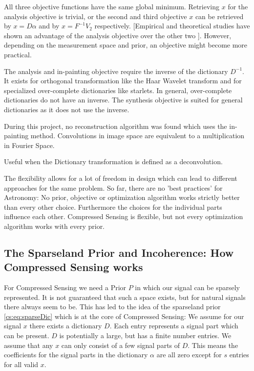 All three objective functions have the same global minimum. Retrieving $x$ for the analysis objective is trivial, or the second and third objective $x$ can be retrieved by $x = D\alpha$ and by $x = F^{-1}V_2$ respectively. [Empirical and theoretical studies have shown an advantage of the analysis objective over the other two \cite{something}]. However, depending on the measurement space and prior, an objective might become more practical. 

The analysis and in-painting objective require the inverse of the dictionary $D^{-1}$. It exists for orthogonal transformation like the Haar Wavelet transform and for specialized over-complete dictionaries like starlets. In general, over-complete dictionaries do not have an inverse. The synthesis objective is suited for general dictionaries as it does not use the inverse.

During this project, no reconstruction algorithm was found which uses the in-painting method. 
Convolutions in image space are equivalent to a multiplication in Fourier Space.

Useful when the Dictionary transformation is defined as a deconvolution.




The flexibility allows for a lot of freedom in design which can lead to different approaches for the same problem. So far, there are no 'best practices' for Astronomy: No prior, objective or optimization algorithm works strictly better than every other choice. Furthermore the choices for the individual parts influence each other. Compressed Sensing is flexible, but not every optimization algorithm works with every prior.


\subsection{The Sparseland Prior and Incoherence: How Compressed Sensing works}
For Compressed Sensing we need a Prior $P$ in which our signal can be sparsely represented. It is not guaranteed that such a space exists, but for natural signals there always seem to be. This has led to the idea of the sparseland prior \eqref{cs:eq:sparseDic} which is at the core of Compressed Sensing: We assume for our signal $x$ there exists a dictionary $D$. Each entry represents a signal part which can be present. $D$ is potentially a large, but has a finite number entries. We assume that any $x$ can only consist of a few signal parts of $D$. This means the coefficients for the signal parts in the dictionary $\alpha$ are all zero except for $s$ entries for all valid $x$. 

